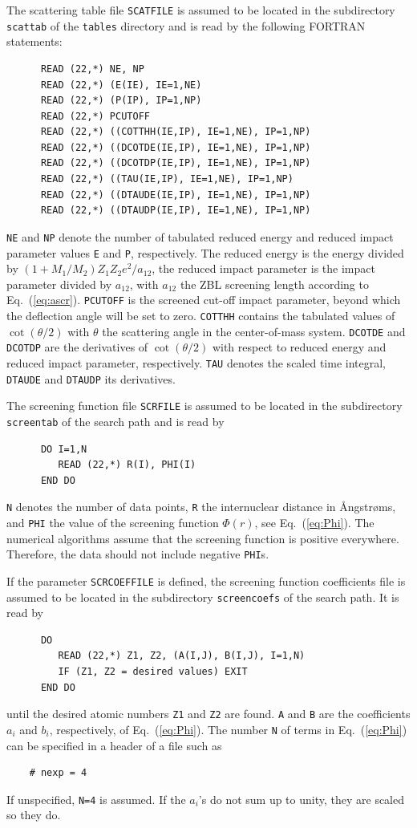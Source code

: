 The scattering table file \texttt{SCATFILE} is assumed to be located in the
subdirectory \texttt{scattab} of the \texttt{tables} directory and is read by
the following FORTRAN statements:
%
\begin{verbatim}
      READ (22,*) NE, NP
      READ (22,*) (E(IE), IE=1,NE)
      READ (22,*) (P(IP), IP=1,NP)
      READ (22,*) PCUTOFF
      READ (22,*) ((COTTHH(IE,IP), IE=1,NE), IP=1,NP)
      READ (22,*) ((DCOTDE(IE,IP), IE=1,NE), IP=1,NP)
      READ (22,*) ((DCOTDP(IE,IP), IE=1,NE), IP=1,NP)
      READ (22,*) ((TAU(IE,IP), IE=1,NE), IP=1,NP)
      READ (22,*) ((DTAUDE(IE,IP), IE=1,NE), IP=1,NP)
      READ (22,*) ((DTAUDP(IE,IP), IE=1,NE), IP=1,NP)
\end{verbatim}
%
\texttt{NE} and \texttt{NP} denote the number of tabulated reduced energy and
reduced impact parameter values \texttt{E} and \texttt{P}, respectively. The
reduced energy is the energy divided by $(1+M_1/M_2)Z_1Z_2e^2/a_{12}$, the
reduced impact parameter is the impact parameter divided by $a_{12}$, with
$a_{12}$ the ZBL screening length according to Eq.~(\ref{eq:ascr}).
\texttt{PCUTOFF} is the screened cut-off impact parameter, beyond which the
deflection angle will be set to zero.  \texttt{COTTHH} contains the tabulated
values of $\cot(\theta/2)$ with $\theta$ the scattering angle in the
center-of-mass system. \texttt{DCOTDE} and \texttt{DCOTDP} are the derivatives
of $\cot(\theta/2)$ with respect to reduced energy and reduced impact
parameter, respectively. \texttt{TAU} denotes the scaled time integral,
\texttt{DTAUDE} and \texttt{DTAUDP} its derivatives.

The screening function file \texttt{SCRFILE} is assumed to be located in the
subdirectory \texttt{screentab} of the search path and is read by
%
\begin{verbatim}
      DO I=1,N
         READ (22,*) R(I), PHI(I)
      END DO 
\end{verbatim}
%
\texttt{N} denotes the number of data points, \texttt{R} the internuclear
distance in {\AA}ngstr{\o}ms, and \texttt{PHI} the value of the screening
function $\Phi(r)$, see Eq.~(\ref{eq:Phi}). The numerical algorithms
assume that the screening function is positive everywhere. Therefore, the 
data should not include negative \texttt{PHI}s.


If the parameter \texttt{SCRCOEFFILE} is defined, the screening function 
coefficients file is assumed to be located in the subdirectory 
\texttt{screencoefs} of the search path. It is read by
%
\begin{verbatim}
      DO
         READ (22,*) Z1, Z2, (A(I,J), B(I,J), I=1,N)
         IF (Z1, Z2 = desired values) EXIT
      END DO 
\end{verbatim}
%
until the desired atomic numbers \texttt{Z1} and \texttt{Z2} are found.
\texttt{A} and \texttt{B} are the coefficients $a_i$ and $b_i$, respectively, 
of Eq.~(\ref{eq:Phi}). The number \texttt{N} of terms in Eq.~(\ref{eq:Phi}) 
can be specified in a header of a file such as
%
\begin{verbatim}
    # nexp = 4
\end{verbatim}
%
If unspecified, \texttt{N=4} is assumed. If the $a_i$'s do not sum up to unity,
they are scaled so they do.

